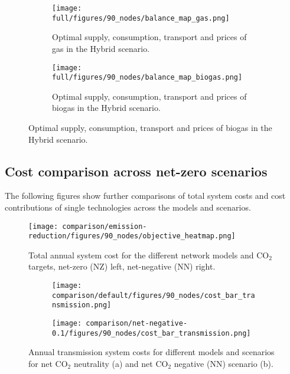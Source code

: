 \documentclass[twocolumn]{article}
\newcommand{\carbon}{CO$_2$}
\newcommand{\hybridscenario}{Hybrid scenario}
\begin{document}
\begin{figure}[ht!]
    \centering
    \begin{subfigure}{0.5\textwidth}
        \texttt{[image: full/figures/90\_nodes/balance\_map\_gas.png]}
        \caption{Optimal supply, consumption, transport and prices of gas in the \hybridscenario{}.}
        \label{fig:balance_map_gas}
    \end{subfigure}%
    \begin{subfigure}{0.5\textwidth}
        \texttt{[image: full/figures/90\_nodes/balance\_map\_biogas.png]}
        \caption{Optimal supply, consumption, transport and prices of biogas in the \hybridscenario{}.}
        \label{fig:balance_map_biogas}
    \end{subfigure}
\end{figure}

\clearpage
\subsection{Cost comparison across net-zero scenarios}
\label{sec:cost_comparison}

The following figures show further comparisons of total system costs and cost contributions of single technologies across the models and scenarios.

\begin{figure}[h!]
    \centering
    \texttt{[image: comparison/emission-reduction/figures/90\_nodes/objective\_heatmap.png]}
    \caption{Total annual system cost for the different network models and \carbon{} targets, net-zero (NZ) left, net-negative (NN) right.}
    \label{fig:objective_heatmap}
\end{figure}

\begin{figure}[h!]
    \centering
    \begin{subfigure}{.5\textwidth}
        \centering
        \texttt{[image: comparison/default/figures/90\_nodes/cost\_bar\_transmission.png]}
        \caption{}
        \label{fig:cost_bar_transmission}
    \end{subfigure}%
    \begin{subfigure}{.5\textwidth}
        \centering
        \texttt{[image: comparison/net-negative-0.1/figures/90\_nodes/cost\_bar\_transmission.png]}
        \caption{}
        \label{fig:cost_bar_transmission_nn}
    \end{subfigure}
    \caption{Annual transmission system costs for different models and scenarios for net \carbon{} neutrality (a) and net \carbon{} negative (NN) scenario (b).}
\end{figure}
\end{document}
